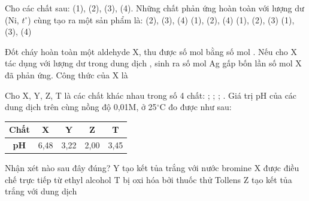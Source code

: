 \documentclass[12pt,a4paper]{article}
\begin{document}
\begin{ex}
Cho các chất sau:  (1),  (2),  (3),  (4). Những chất phản ứng hoàn toàn với lượng dư  (Ni, $t^\circ$) cùng tạo ra một sản phẩm là:
\choice
{(2), (3), (4)}
{\True (1), (2), (4)}
{(1), (2), (3)}
{(1), (3), (4)}

\end{ex}

\begin{ex}
Đốt cháy hoàn toàn một aldehyde X, thu được số mol  bằng số mol . Nếu cho X tác dụng với lượng dư  trong dung dịch , sinh ra số mol Ag gấp bốn lần số mol X đã phản ứng. Công thức của X là
\choice
{\True {}}
{}
{}
{}

\end{ex}

\begin{ex}
Cho X, Y, Z, T là các chất khác nhau trong số 4 chất: ; ; ; . Giá trị pH của các dung dịch trên cùng nồng độ 0,01M, ở 25$^\circ$C đo được như sau:
\begin{center}
\begin{tabular}{|c|c|c|c|c|}
\hline
\textbf{Chất} & X & Y & Z & T \\ \hline
\textbf{pH} & 6,48 & 3,22 & 2,00 & 3,45 \\ \hline
\end{tabular}
\end{center}
Nhận xét nào sau đây đúng?
\choice
{Y tạo kết tủa trắng với nước bromine}
{X được điều chế trực tiếp từ ethyl alcohol}
{T bị oxi hóa bởi thuốc thử Tollens}
{\True Z tạo kết tủa trắng với dung dịch }

\end{ex}
\end{document}
